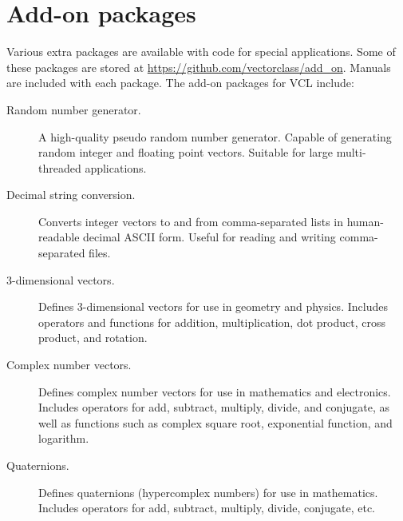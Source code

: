 \documentclass[vcl_manual.tex]{subfiles}
\begin{document}
\chapter{Add-on packages}\label{chap:AddOnPackages}
\flushleft

Various extra packages are available with code for special applications. 
Some of these packages are stored at \url{https://github.com/vectorclass/add_on}.
Manuals are included with each package. The add-on packages for VCL include:

\begin{description}

\item[Random number generator.] 
   A high-quality pseudo random number generator. Capable of generating random integer and floating point vectors. Suitable for large multi-threaded applications.

\item[Decimal string conversion.] 
   Converts integer vectors to and from comma-separated lists in human-readable decimal ASCII form. Useful for reading and writing comma-separated files.

\item[3-dimensional vectors.] 
   Defines 3-dimensional vectors for use in geometry and physics. 
   Includes operators and functions for addition, multiplication, dot product, cross product, and rotation.
   
\item[Complex number vectors.]    
   Defines complex number vectors for use in mathematics and electronics. 
   Includes operators for add, subtract, multiply, divide, and conjugate, as well as functions such as complex square root, exponential function, and logarithm.
   
\item[Quaternions.]    
   Defines quaternions (hypercomplex numbers) for use in mathematics.
   Includes operators for add, subtract, multiply, divide, conjugate, etc.




\end{description}
\end{document}
